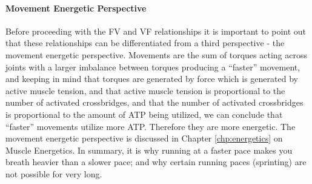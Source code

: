 \paragraph{Movement Energetic Perspective}
Before proceeding with the FV and VF relationships it is important to point out that these relationships can be differentiated from a third perspective - the movement energetic perspective. Movements are the sum of torques acting across joints with a larger imbalance between torques producing a “faster” movement, and keeping in mind that torques are generated by force which is generated by active muscle tension, and that active muscle tension is proportional to the number of activated crossbridges, and that the number of activated crossbridges is proportional to the amount of ATP being utilized, we can conclude that “faster” movements utilize more ATP. Therefore they are more energetic. The movement energetic perspective is discussed in Chapter \ref{chp:energetics} on Muscle Energetics. In summary, it is why running at a faster pace makes you breath heavier than a slower pace; and why certain running paces (sprinting) are not possible for very long. \footnotemark{} 






